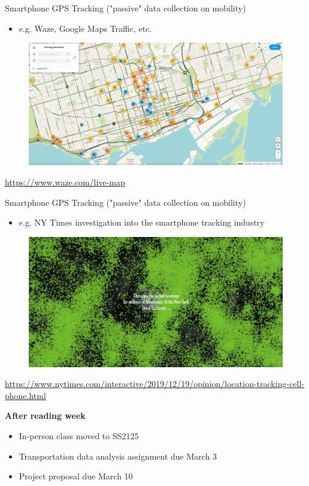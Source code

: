 \documentclass[aspectratio=169]{beamer}
\begin{document}
\begin{frame}
	
	Smartphone GPS Tracking ("passive" data collection on mobility)
	
	\begin{itemize}
		\item e.g. Waze, Google Maps Traffic, etc.
	\end{itemize}
	
	
	
	
	\begin{figure}
		\centering
		\includegraphics[width=0.8\linewidth]{images/waze.png}
	\end{figure}
	\tiny\url{https://www.waze.com/live-map}
	
\end{frame}



\begin{frame}
	
	Smartphone GPS Tracking ("passive" data collection on mobility)
	
	\begin{itemize}
		\item e.g. NY Times investigation into the smartphone tracking industry
	\end{itemize}
	
	
	\begin{figure}
		\centering
		\includegraphics[width=0.8\linewidth]{images/nytimes_gps_stockexchange.png}
	\end{figure}
	\tiny\url{https://www.nytimes.com/interactive/2019/12/19/opinion/location-tracking-cell-phone.html}
	
\end{frame}





\begin{frame}
	
	\textbf{After reading week}
	
	\begin{itemize}
		\item In-person class moved to SS2125
		\item Transportation data analysis assignment due March 3
		\item Project proposal due March 10
	\end{itemize}
	
\end{frame}
\end{document}
